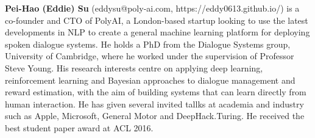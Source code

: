   {\bfseries Pei-Hao (Eddie) Su} (eddysu@poly-ai.com, https://eddy0613.github.io/) is a co-founder and CTO of PolyAI, a London-based startup looking to use the latest developments in NLP to create a general machine learning platform for deploying spoken dialogue systems. He holds a PhD from the Dialogue Systems group, University of Cambridge, where he worked under the supervision of Professor Steve Young. His research interests centre on applying deep learning, reinforcement learning and Bayesian approaches to dialogue management and reward estimation, with the aim of building systems that can learn directly from human interaction. He has given several invited tallks at academia and industry such as Apple, Microsoft, General Motor and DeepHack.Turing. He received the best student paper award at ACL 2016.

